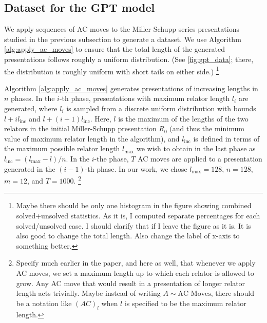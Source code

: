 \subsection{Dataset for the GPT model}

We apply sequences of AC moves to the Miller-Schupp series presentations studied in the previous subsection to generate a dataset. We use Algorithm \autoref{alg:apply_ac_moves} to ensure that the total length of the generated presentations follows roughly a uniform distribution. (See \autoref{fig:gpt_data}; there, the distribution is roughly uniform with short tails on either side.)
\footnote{Maybe there should be only one histogram in the figure showing combined solved+unsolved statistics. As it is, I computed separate percentages for each solved/unsolved case. I should clarify that if I leave the figure as it is. It is also good to change the total length. Also change the label of x-axis to something better.}

Algorithm \autoref{alg:apply_ac_moves} generates presentations of increasing lengths in $n$ phases. In the $i$-th phase, presentations with maximum relator length $l_i$ are generated, where $l_i$ is sampled from a discrete uniform distribution with bounds $l + i l_{\text{inc}} $ and $l + (i+1) l_{\text{inc}}$. Here, $l$ is the maximum of the lengths of the two relators in the initial Miller-Schupp presentation $R_0$ (and thus the minimum value of maximum relator length in the algorithm), and $l_{\text{inc}}$ is defined in terms of the maximum possible relator length $l_{\text{max}}$ we wish to obtain in the last phase as $l_{\text{inc}} = (l_{\text{max}}-l)/n$. In the $i$-the phase, $T$ AC moves are applied to a presentation generated in the $(i-1)$-th phase. In our work, we chose $l_{\text{max}}=128$, $n=128$, $m=12$, and $T=1000$.
\footnote{Specify much earlier in the paper, and here as well, that whenever we apply AC moves, we set a maximum length up to which each relator is allowed to grow. Any AC move that would result in a presentation of longer relator length acts trivially. Maybe instead of writing $A \sim \text{AC Moves}$, there should be a notation like $(AC)_l$ when $l$ is specified to be the maximum relator length.}



